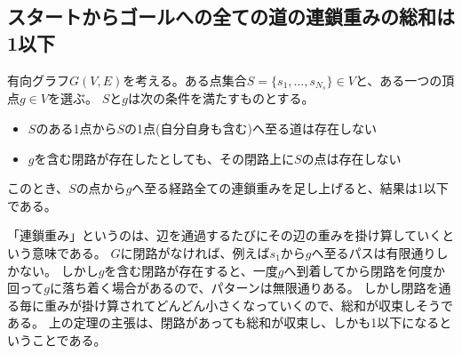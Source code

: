 			\subsection{スタートからゴールへの全ての道の連鎖重みの総和は1以下}
				\begin{shadebox}
					有向グラフ$G(V,E)$を考える。ある点集合$S = \{s_1,\dotsc,s_{N_s}\}\in V$と、ある一つの頂点$g\in V$を選ぶ。
					$S$と$g$は次の条件を満たすものとする。
					\begin{itemize}
						\item $S$のある1点から$S$の1点(自分自身も含む)へ至る道は存在しない
						\item $g$を含む閉路が存在したとしても、その閉路上に$S$の点は存在しない
					\end{itemize}
					このとき、$S$の点から$g$へ至る経路全ての連鎖重みを足し上げると、結果は1以下である。
				\end{shadebox}
				「連鎖重み」というのは、辺を通過するたびにその辺の重みを掛け算していくという意味である。
				$G$に閉路がなければ、例えば$s_1$から$g$へ至るパスは有限通りしかない。
				しかし$g$を含む閉路が存在すると、一度$g$へ到着してから閉路を何度か回って$g$に落ち着く場合があるので、パターンは無限通りある。
				しかし閉路を通る毎に重みが掛け算されてどんどん小さくなっていくので、総和が収束しそうである。
				上の定理の主張は、閉路があっても総和が収束し、しかも1以下になるということである。
